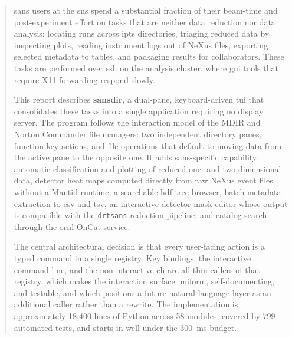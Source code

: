 \documentclass[tm]{ornltm}
\begin{document}
\mainmatter
\begin{abstract}

\Ac{sans} users at the \ac{sns} spend a substantial fraction of their beam-time
and post-experiment effort on tasks that are neither data reduction nor data
analysis: locating runs across \ac{ipts} directories, triaging reduced data by
inspecting plots, reading instrument logs out of NeXus files, exporting selected
metadata to tables, and packaging results for collaborators. These tasks are
performed over \ac{ssh} on the analysis cluster, where \ac{gui} tools that
require X11 forwarding respond slowly.

This report describes \textbf{sansdir}, a dual-pane, keyboard-driven \ac{tui}
that consolidates these tasks into a single application requiring no display
server. The program follows the interaction model of the MDIR and Norton
Commander file managers: two independent directory panes, function-key actions,
and file operations that default to moving data from the active pane to the
opposite one. It adds \ac{sans}-specific capability: automatic classification and
plotting of reduced one- and two-dimensional data, detector heat maps computed
directly from raw NeXus event files without a Mantid runtime, a searchable
\ac{hdf} tree browser, batch metadata extraction to \ac{csv} and \ac{tsv}, an
interactive detector-mask editor whose output is compatible with the
\texttt{drtsans} reduction pipeline, and catalog search through the \ac{ornl}
OnCat service.

The central architectural decision is that every user-facing action is a typed
command in a single registry. Key bindings, the interactive command line, and
the non-interactive \ac{cli} are all thin callers of that registry, which makes
the interaction surface uniform, self-documenting, and testable, and which
positions a future natural-language layer as an additional caller rather than a
rewrite. The implementation is approximately 18,400 lines of Python across 58
modules, covered by 799 automated tests, and starts in well under the
300~ms budget.

\end{abstract}

\acresetall
\end{document}
